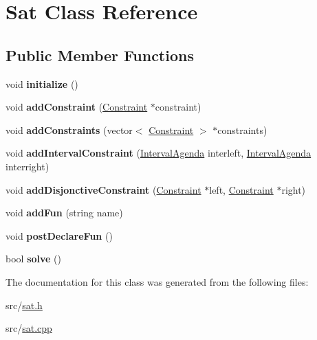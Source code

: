 \hypertarget{classSat}{\section{Sat Class Reference}
\label{classSat}
}
\subsection*{Public Member Functions}
\begin{DoxyCompactItemize}
\item 
\hypertarget{classSat_ac7fd375deeb1c2028c883ba566f075de}{void {\bfseries initialize} ()}\label{classSat_ac7fd375deeb1c2028c883ba566f075de}

\item 
\hypertarget{classSat_a8622bbda374afc833942206b9814cbcd}{void {\bfseries add\+Constraint} (\hyperlink{classstd_1_1Constraint}{Constraint} $\ast$constraint)}\label{classSat_a8622bbda374afc833942206b9814cbcd}

\item 
\hypertarget{classSat_a31f003309263c482442d977f246e9511}{void {\bfseries add\+Constraints} (vector$<$ \hyperlink{classstd_1_1Constraint}{Constraint} $>$ $\ast$constraints)}\label{classSat_a31f003309263c482442d977f246e9511}

\item 
\hypertarget{classSat_a8331634e0d028d34cb0dba466024312e}{void {\bfseries add\+Interval\+Constraint} (\hyperlink{classIntervalAgenda}{Interval\+Agenda} interleft, \hyperlink{classIntervalAgenda}{Interval\+Agenda} interright)}\label{classSat_a8331634e0d028d34cb0dba466024312e}

\item 
\hypertarget{classSat_a47ce05c04155f2a9fdb61760faa4b874}{void {\bfseries add\+Disjonctive\+Constraint} (\hyperlink{classstd_1_1Constraint}{Constraint} $\ast$left, \hyperlink{classstd_1_1Constraint}{Constraint} $\ast$right)}\label{classSat_a47ce05c04155f2a9fdb61760faa4b874}

\item 
\hypertarget{classSat_a2f5ed9769b0530034e872279302caad4}{void {\bfseries add\+Fun} (string name)}\label{classSat_a2f5ed9769b0530034e872279302caad4}

\item 
\hypertarget{classSat_ab0b698086da960dc6056b6ac33ce7a2d}{void {\bfseries post\+Declare\+Fun} ()}\label{classSat_ab0b698086da960dc6056b6ac33ce7a2d}

\item 
\hypertarget{classSat_af228f844eae4cebef317d23c17e8fbd4}{bool {\bfseries solve} ()}\label{classSat_af228f844eae4cebef317d23c17e8fbd4}

\end{DoxyCompactItemize}


The documentation for this class was generated from the following files\+:\begin{DoxyCompactItemize}
\item 
src/\hyperlink{sat_8h}{sat.\+h}\item 
src/\hyperlink{sat_8cpp}{sat.\+cpp}\end{DoxyCompactItemize}
